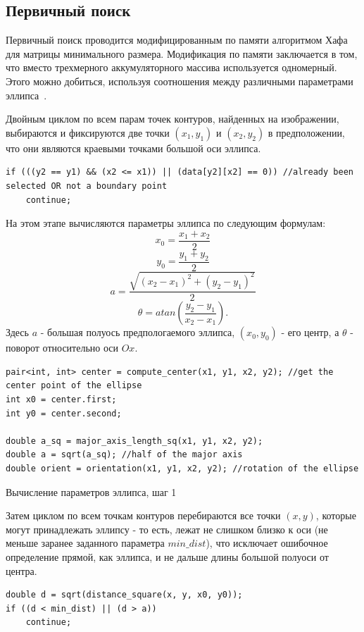 \subsection{Первичный поиск}
Первичный поиск проводится модифицированным по памяти алгоритмом Хафа для матрицы минимального размера.
Модификация по памяти заключается в том, что вместо трехмерного аккумуляторного массива используется одномерный.
Этого можно добиться, используя соотношения между различными параметрами эллипса~\autocite{OneDim}.

Двойным циклом по всем парам точек контуров, найденных на изображении, выбираются и фиксируются две точки \((x_1, y_1)\) и \((x_2, y_2)\) в предположении, что они являются краевыми точками большой оси эллипса.

\begin{lstlisting}
if (((y2 == y1) && (x2 <= x1)) || (data[y2][x2] == 0)) //already been selected OR not a boundary point
    continue;
\end{lstlisting}

На этом этапе вычисляются параметры эллипса по следующим формулам:
$$x_0 = \frac{x_1 + x_2}{2}$$
$$y_0 = \frac{y_1 + y_2}{2}$$
$$a = \frac{\sqrt{(x_2 - x_1)^2 + (y_2 - y_1)^2}}{2}$$
$$\theta = atan(\frac{y_2 - y_1}{x_2 - x_1}).$$
Здесь \(a\) - большая полуось предпологаемого эллипса, \((x_0, y_0)\) - его центр, а \(\theta\) - поворот относительно оси \(Ox\).

\begin{ListingEnv}[H]
\begin{lstlisting}
pair<int, int> center = compute_center(x1, y1, x2, y2); //get the center point of the ellipse
int x0 = center.first;
int y0 = center.second;

double a_sq = major_axis_length_sq(x1, y1, x2, y2);
double a = sqrt(a_sq); //half of the major axis
double orient = orientation(x1, y1, x2, y2); //rotation of the ellipse
\end{lstlisting}
\caption{Вычисление параметров эллипса, шаг 1}
\label{list:majoraxis}
\end{ListingEnv}
Затем циклом по всем точкам контуров перебираются все точки \((x,y)\), которые могут принадлежать эллипсу - то есть, лежат не слишком близко к оси (не меньше заранее заданного параметра \(min\_dist\)), 
что исключает ошибочное определение прямой, как эллипса, и не дальше длины большой полуоси от центра.

\begin{lstlisting}
double d = sqrt(distance_square(x, y, x0, y0));
if ((d < min_dist) || (d > a))
    continue;
\end{lstlisting}

